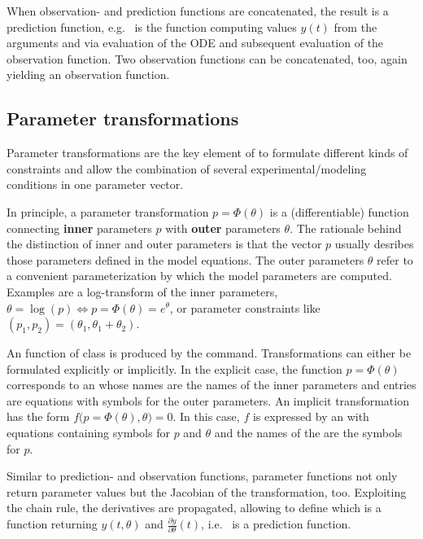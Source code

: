 \documentclass[article]{jss}
\begin{document}
When observation- and prediction functions are concatenated, the result is a prediction function, e.g.~ is the  function computing values $y(t)$ from the arguments  and  via evaluation of the ODE and subsequent evaluation of the observation function. Two observation functions can be concatenated, too, again yielding an observation function.

\subsection{Parameter transformations}

Parameter transformations are the key element of  to formulate different kinds of constraints and allow the combination of several experimental/modeling conditions in one parameter vector.

In principle, a parameter transformation $p = \Phi(\theta)$ is a (differentiable) function connecting \textbf{inner} parameters $p$ with \textbf{outer} parameters $\theta$. The rationale behind the distinction of inner and outer parameters is that the vector $p$ usually desribes those parameters defined in the model equations. The outer parameters $\theta$ refer to a convenient parameterization by which the model parameters are computed. Examples are a log-transform of the inner parameters, $\theta = \log(p) \Leftrightarrow p = \Phi(\theta) = e^{\theta}$, or parameter constraints like $(p_1, p_2) = (\theta_1, \theta_1 + \theta_2)$.

An  function of class  is produced by the  command. Transformations can either be formulated explicitly or implicitly. In the explicit case, the function $p = \Phi(\theta)$ corresponds to an  whose names are the names of the inner parameters and entries are equations with symbols for the outer parameters. An implicit transformation has the form $f\big(p = \Phi(\theta), \theta\big) = 0$. In this case, $f$ is expressed by an  with equations containing symbols for $p$ and $\theta$ and the names of the  are the symbols for $p$.

Similar to prediction- and observation functions, parameter functions not only return parameter values but the Jacobian of the transformation, too. Exploiting the chain rule, the derivatives are propagated, allowing to define  which is a function returning $y(t, \theta)$ and $\frac{\partial y}{\partial \theta}(t)$, i.e.~ is a prediction function.
\end{document}
